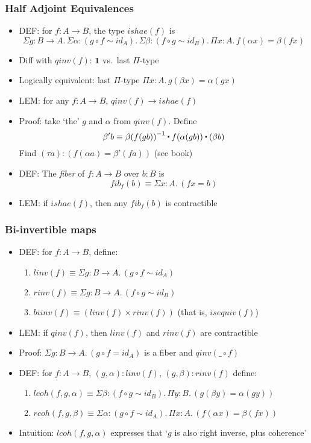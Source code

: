 \documentclass[handout]{beamer}
\newcommand{\depi}[3]{\Pi{#1{:}#2.\,#3}}
\newcommand{\sigm}[3]{\Sigma{#1{:}#2.\,#3}}
\newcommand{\bfone}{\mathbf{1}}
\newcommand{\ct}{%
  \mathchoice{\mathbin{\raisebox{0.5ex}{$\displaystyle\centerdot$}}}%
             {\mathbin{\raisebox{0.5ex}{$\centerdot$}}}%
             {\mathbin{\raisebox{0.25ex}{$\scriptstyle\,\centerdot\,$}}}%
             {\mathbin{\raisebox{0.1ex}{$\scriptscriptstyle\,\centerdot\,$}}}
}
\newcommand{\opp}[1]{\mathord{{#1}^{-1}}}
\begin{document}
\frame
  {
    \frametitle{Half Adjoint Equivalences}

    \begin{itemize}[<+->]
    \item DEF: for $f:A\to B$, the type $ishae(f)$ is 
          $$\!\!\!\!\!\!\sigm{g}{B\to A}
             {\sigm{\alpha}{(g\circ f \sim id_A)}
              {\sigm{\beta}{(f\circ g \sim id_B)}
               {\depi{x}{A}{f(\alpha x) = \beta(fx)}}}}$$
    \item Diff with $qinv(f)$:    $\bfone$ vs.\ last $\Pi$-type 
    \item Logically equivalent:  last $\Pi$-type $\depi{x}{A}{g(\beta x) = \alpha(gx)}$
    \item LEM: for any $f:A\to B$, $qinv(f) \to ishae(f)$
    \item Proof: take `the' $g$ and $\alpha$ from $qinv(f)$. Define
    \[\beta' b \equiv \beta\opp {(f (g b))}\ct f(\alpha (g b)) \ct (\beta b)\]
    Find $(\tau a) : (f(\alpha a) = \beta'(fa))$ (see book)
    \item DEF: The \emph{fiber} of $f:A\to B$ over $b:B$ is 
    \[fib_f (b) \equiv \sigm{x}{A}{(f x = b)}\]
    \item LEM: if $ishae(f)$, then any $fib_f (b)$ is contractible
    \end{itemize}
  }

\frame
  {
    \frametitle{Bi-invertible maps}

    \begin{itemize}[<+->]
    \item DEF: for $f:A\to B$, define:
      \begin{enumerate}[<+->]
      \item $linv(f) \equiv \sigm{g}{B\to A}{(g\circ f \sim id_A)}$ 
      \item $rinv(f) \equiv \sigm{g}{B\to A}{(f\circ g \sim id_B)}$
      \item $biinv(f) \equiv (linv(f) \times rinv(f))$  (that is, $isequiv(f)$) 
      \end{enumerate}    
    \item LEM: if $qinv(f)$, then $linv(f)$ and $rinv(f)$ are contractible
    \item Proof: $\sigm{g}{B\to A}{(g\circ f = id_A)}$ is a fiber and $qinv(\_\circ f)$
    \item DEF: for $f:A\to B$,  $(g,\alpha):linv(f)$,  $(g,\beta):rinv(f)$ define:
      \begin{enumerate}[<+->]
      \item $lcoh(f,g,\alpha) \equiv \sigm{\beta}{(f\circ g \sim id_B)}{\depi{y}{B}{(g(\beta y) = \alpha(gy))}}$ 
      \item $rcoh(f,g,\beta) \equiv \sigm{\alpha}{(g\circ f \sim id_A)}{\depi{x}{A}{(f(\alpha x) = \beta(fx))}}$     
      \end{enumerate}    
    \item Intuition: $lcoh(f,g,\alpha)$ expresses that `$g$ is also right inverse, plus coherence'
    \end{itemize}
  }
\end{document}
